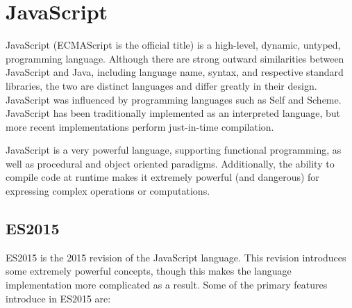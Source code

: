 \section{JavaScript}

JavaScript (ECMAScript is the official title) is a high-level, dynamic, untyped, programming language. Although there are strong outward similarities between JavaScript and Java, including language name, syntax, and respective standard libraries, the two are distinct languages and differ greatly in their design. JavaScript was influenced by programming languages such as Self and Scheme. JavaScript has been traditionally implemented as an interpreted language, but more recent implementations perform just-in-time compilation. %

JavaScript is a very powerful language, supporting functional programming, as well as procedural and object oriented paradigms.  Additionally, the ability to compile code at runtime makes it extremely powerful (and dangerous) for expressing complex operations or computations.  

\subsection{ES2015}
ES2015 is the 2015 revision of the JavaScript language. This revision introduces some extremely powerful concepts, though this makes the language implementation more complicated as a result.  Some of the primary features introduce in ES2015 are:

